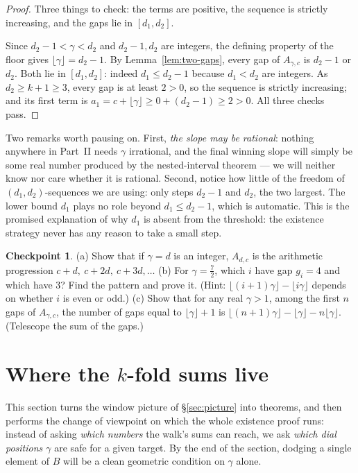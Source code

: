 \documentclass[11pt,reqno]{amsart}
\theoremstyle{plain}
\theoremstyle{definition}
\newtheorem{checkpoint}[theorem]{Checkpoint}   %
\theoremstyle{remark}
\begin{document}
\begin{proof}
Three things to check: the terms are positive, the sequence is strictly increasing,
and the gaps lie in $[d_1, d_2]$.

Since $d_2 - 1 < \gamma < d_2$ and $d_2 - 1, d_2$ are integers, the defining property
of the floor gives $\lfloor \gamma \rfloor = d_2 - 1$. By
Lemma~\ref{lem:two-gaps}, every gap of $A_{\gamma,c}$ is $d_2 - 1$ or $d_2$. Both lie
in $[d_1, d_2]$: indeed $d_1 \le d_2 - 1$ because $d_1 < d_2$ are integers. As
$d_2 \ge k + 1 \ge 3$, every gap is at least $2 > 0$, so the sequence is strictly
increasing; and its first term is $a_1 = c + \lfloor \gamma \rfloor \ge 0 + (d_2 - 1)
\ge 2 > 0$. All three checks pass.
\end{proof}

Two remarks worth pausing on. First, \emph{the slope may be rational}: nothing
anywhere in Part~II needs $\gamma$ irrational, and the final winning slope will simply
be some real number produced by the nested-interval theorem --- we will neither know
nor care whether it is rational. Second, notice how little of the freedom of
$(d_1,d_2)$-sequences we are using: only steps $d_2 - 1$ and $d_2$, the two largest.
The lower bound $d_1$ plays no role beyond $d_1 \le d_2 - 1$, which is automatic. This
is the promised explanation of why $d_1$ is absent from the threshold: the existence
strategy never has any reason to take a small step.

\begin{checkpoint}
(a) Show that if $\gamma = d$ is an integer, $A_{d,c}$ is the arithmetic progression
$c + d,\ c + 2d,\ c + 3d, \dots$
(b) For $\gamma = \tfrac{7}{2}$, which $i$ have gap $g_i = 4$ and which have $3$? Find
the pattern and prove it. (Hint: $\lfloor (i+1)\gamma\rfloor - \lfloor i\gamma\rfloor$
depends on whether $i$ is even or odd.)
(c) Show that for any real $\gamma > 1$, among the first $n$ gaps of $A_{\gamma,c}$,
the number of gaps equal to $\lfloor\gamma\rfloor + 1$ is
$\lfloor (n+1)\gamma \rfloor - \lfloor \gamma \rfloor - n\lfloor\gamma\rfloor$.
(Telescope the sum of the gaps.)
\end{checkpoint}

\section{Where the \texorpdfstring{$k$}{k}-fold sums live}\label{sec:windows}

This section turns the window picture of \S\ref{sec:picture} into theorems, and then
performs the change of viewpoint on which the whole existence proof runs: instead of
asking \emph{which numbers} the walk's sums can reach, we ask \emph{which dial
positions $\gamma$} are safe for a given target. By the end of the section, dodging a
single element of $B$ will be a clean geometric condition on $\gamma$ alone.
\end{document}
